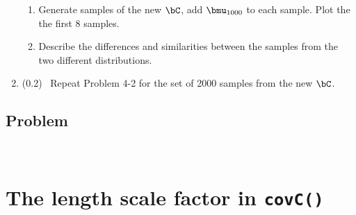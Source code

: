 \documentclass[11pt,titlepage,fleqn]{article}
\begin{document}
\begin{enumerate}
\begin{enumerate}
\item Generate samples of the new $\bC$, add $\bmu_{1000}$ to each sample. Plot the the first 8 samples.

\item Describe the differences and similarities between the samples from the two different distributions.

\end{enumerate}


\item (0.2) \ptag\ Repeat Problem 4-2 for the set of 2000 samples from the new $\bC$.

\end{enumerate}


\pagebreak
\subsection*{Problem} \howmuchtime\




\pagebreak

\appendix

\section{The length scale factor in {\tt covC()}}
\label{sec:matern}
\end{document}

